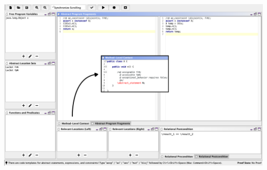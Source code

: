 \begin{frame}\vspace*{-5mm}
  \begin{center}
    \includegraphics[scale=.25]{screenshots/ExtractLocalVariable}
  \end{center}   
\end{frame}




